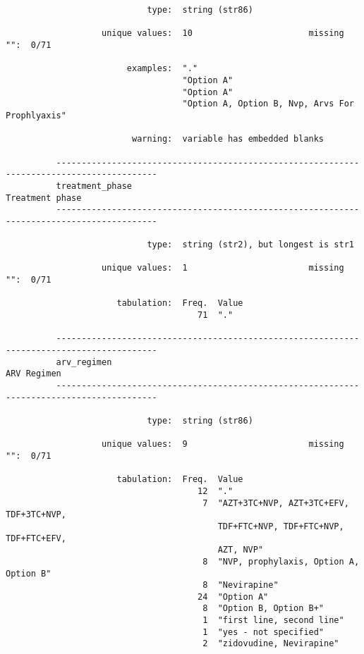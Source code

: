 \documentclass{article}
\begin{document}
\begin{verbatim}
                            type:  string (str86)
          
                   unique values:  10                       missing "":  0/71
          
                        examples:  "."
                                   "Option A"
                                   "Option A"
                                   "Option A, Option B, Nvp, Arvs For Prophlyaxis"
          
                         warning:  variable has embedded blanks
          
          ------------------------------------------------------------------------------------------
          treatment_phase                                                            Treatment phase
          ------------------------------------------------------------------------------------------
          
                            type:  string (str2), but longest is str1
          
                   unique values:  1                        missing "":  0/71
          
                      tabulation:  Freq.  Value
                                      71  "."
          
          ------------------------------------------------------------------------------------------
          arv_regimen                                                                    ARV Regimen
          ------------------------------------------------------------------------------------------
          
                            type:  string (str86)
          
                   unique values:  9                        missing "":  0/71
          
                      tabulation:  Freq.  Value
                                      12  "."
                                       7  "AZT+3TC+NVP, AZT+3TC+EFV, TDF+3TC+NVP,
                                          TDF+FTC+NVP, TDF+FTC+NVP, TDF+FTC+EFV,
                                          AZT, NVP"
                                       8  "NVP, prophylaxis, Option A, Option B"
                                       8  "Nevirapine"
                                      24  "Option A"
                                       8  "Option B, Option B+"
                                       1  "first line, second line"
                                       1  "yes - not specified"
                                       2  "zidovudine, Nevirapine"
          

\end{verbatim}
\end{document}
